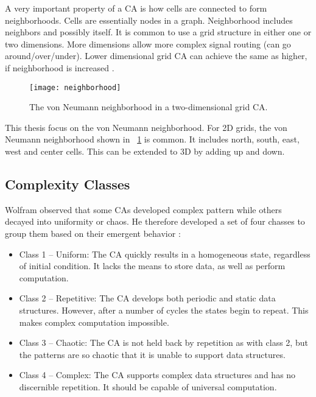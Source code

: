A very important property of a CA is how cells are connected to form neighborhoods.
Cells are essentially nodes in a graph.
Neighborhood includes neighbors and possibly itself.
It is common to use a grid structure in either one or two dimensions.
More dimensions allow more complex signal routing (can go around/over/under).
Lower dimensional grid CA can achieve the same as higher, if neighborhood is increased \CN.

\begin{figure}[!ht]
    \centering
    \texttt{[image: neighborhood]}
    \caption[Neighborhood]{
        The von Neumann neighborhood in a two-dimensional grid CA.
    }
    \label{fig:neighborhood}
\end{figure}

This thesis focus on the von Neumann neighborhood.
For 2D grids, the von Neumann neighborhood shown in \figurename~\ref{fig:neighborhood} is common.
It includes north, south, east, west and center cells.
This can be extended to 3D by adding up and down.

\subsection{Complexity Classes}

Wolfram observed that some CAs developed complex pattern while others decayed into uniformity or chaos.
He therefore developed a set of four chasses to group them based on their emergent behavior \cite{wolfram1984complexity}:

\begin{itemize}
    \item Class 1 – Uniform:
        The CA quickly results in a homogeneous state, regardless of initial condition.
        It lacks the means to store data, as well as perform computation.
    \item Class 2 – Repetitive:
        The CA develops both periodic and static data structures.
        However, after a number of cycles the states begin to repeat.
        This makes complex computation impossible.
    \item Class 3 – Chaotic:
        The CA is not held back by repetition as with class 2, but the patterns are so chaotic that it is unable to support data structures.
    \item Class 4 – Complex:
        The CA supports complex data structures and has no discernible repetition.
        It should be capable of universal computation.
\end{itemize}

